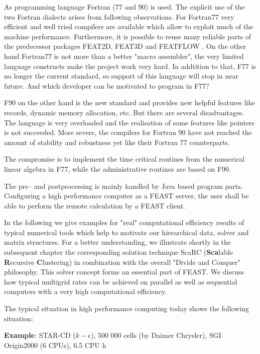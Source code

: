As programming language Fortran (77 and 90) is used. The explicit use of the
two Fortran dialects arises from following observations. For Fortran77 very
efficient and well tried compilers are available which allow to exploit much of the machine performance. 
Furthermore, it is possible
to reuse many reliable parts of the predecessor packages FEAT2D, FEAT3D
and FEATFLOW \cite{TurekBecker1999}. On the other hand Fortran77 is not more than
a better "macro assembler", the very limited language constructs
make the project work very hard. In addtition to that, F77 is no longer the current standard,
so support of this language will stop in near future. And which developer can be
motivated to program in F77?

F90 on the other hand is the new standard and provides new helpful features like records, dynamic memory 
allocation, etc. But there are several disadvantages. The language is very overloaded and the realisation
of some features like pointers is not succeeded. More severe, the compilers for Fortran 90 have not reached
the amount of stability and robustness yet like their Fortran 77 counterparts.  

The compromise is to implement the time critical routines from the numerical
linear algebra in F77, while the administrative routines are based on F90.

The pre-- and postprocessing is mainly handled by Java based program parts. 
Configuring a high performance computer as a FEAST server, the user shall be able to perform the 
remote calculation by a FEAST client. 
 




In the following we give examples for "real" computational efficiency results of typical 
numerical tools which help to motivate our hierarchical data, solver and 
matrix structures. For a better understanding, we illustrate shortly in the subsequent chapter the 
corresponding solution technique {\sc ScaRC} ({\bf Sca}lable {\bf R}ecursive {\bf C}lustering) in 
combination with the overall "Divide and Conquer" philosophy. This solver concept forms an essential part
of {\sc FEAST}. 
We discuss how typical multigrid rates can be achieved on parallel 
as well as sequential computers with a very high computational efficiency.

The typical situation in high performance computing today shows the following situation:


{\bf Example}: STAR-CD ($k-\epsilon$), 500 000 cells (by Daimer Chrysler),
SGI Origin2000 (6 CPUs), 6.5 CPU h


